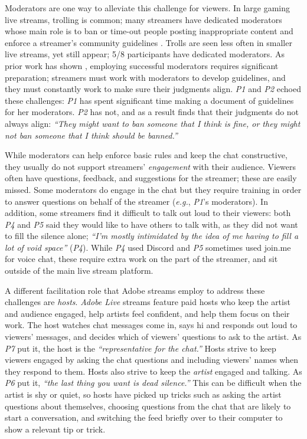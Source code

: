Moderators are one way to alleviate this challenge for viewers. In large gaming live streams, trolling is common; many streamers have dedicated moderators whose main role is to ban or time-out people posting inappropriate content and enforce a streamer's community guidelines \cite{Seering2017, Lo2018, Seering2019, YvetteWohn2019}. Trolls are seen less often in smaller live streams, yet still appear; 5/8 participants have dedicated moderators. As prior work has shown  \cite{Lo2018, Seering2019, YvetteWohn2019}, employing successful moderators requires significant preparation; streamers must work with moderators to develop guidelines, and they must constantly work to make sure their judgments align. \textit{P1} and \textit{P2} echoed these challenges: \textit{P1} has spent significant time making a document of guidelines for her moderators. \textit{P2} has not, and as a result finds that their judgments do not always align: \textit{``They might want to ban someone that I think is fine, or they might not ban someone that I think should be banned.''}

While moderators can help enforce basic rules and keep the chat constructive, they usually do not support streamers' \textit{engagement} with their audience. Viewers often have questions, feedback, and suggestions for the streamer; these are easily missed. Some moderators do engage in the chat \cite{YvetteWohn2019} but they require training in order to answer questions on behalf of the streamer (\textit{e.g.}, \textit{P1}'s moderators). In addition, some streamers find it difficult to talk out loud to their viewers: both \textit{P4} and \textit{P5} said they would like to have others to talk with, as they did not want to fill the silence alone; \textit{``I'm mostly intimidated by the idea of me having to fill a lot of void space''} (\textit{P4}). While \textit{P4} used Discord and \textit{P5} sometimes used join.me for voice chat, these require extra work on the part of the streamer, and sit outside of the main live stream platform.

A different facilitation role that Adobe streams employ to address these challenges are \textit{hosts}. \textit{Adobe Live} streams feature paid hosts who keep the artist and audience engaged, help artists feel confident, and help them focus on their work. The host watches chat messages come in, says hi and responds out loud to viewers' messages, and decides which of viewers' questions to ask to the artist. As \textit{P7} put it, the host is the \textit{``representative for the chat.''} Hosts strive to keep viewers engaged by asking the chat questions and including viewers' names when they respond to them. Hosts also strive to keep the \textit{artist} engaged and talking. As \textit{P6} put it, \textit{``the last thing you want is dead silence.''} This can be difficult when the artist is shy or quiet, so hosts have picked up tricks such as asking the artist questions about themselves, choosing questions from the chat that are likely to start a conversation, and switching the feed briefly over to their computer to show a relevant tip or trick.


